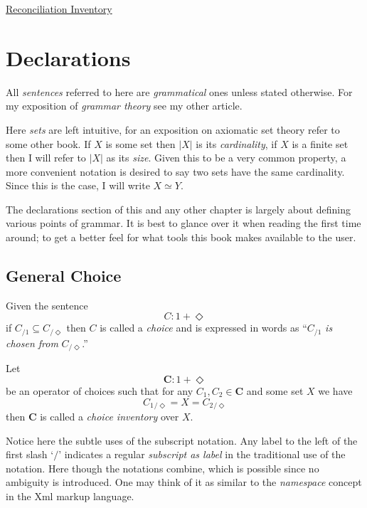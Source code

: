 \documentclass[twoside]{book}
\newcommand{\pass}[1][\Diamond]{\ensuremath{{_{\!/{#1}}}}}
\newcommand{\syntax}[1][\Diamond]{\ensuremath{1+{#1}}}
\renewcommand{\bold}[1][C]{\ensuremath{{\mathbf #1}}}
\newenvironment{definition}[1][Definition]{\begin{trivlist}
\item[\hskip \labelsep {\bfseries Definition (#1):}]}{\end{trivlist}}
\newlength{\htwo}
\begin{document}
\hspace{\htwo}\hypertarget{oReconciliationInventory}{\hyperlink{ReconciliationInventory}{Reconciliation Inventory}}

\section{Declarations}

All \emph{sentences} referred to here are \emph{grammatical} ones unless stated otherwise.  For my
exposition of \emph{grammar theory} see my other article.

Here \emph{sets} are left intuitive, for an exposition on axiomatic set theory refer to some other book.
If $ X $ is some set then $ |X| $ is its \emph{cardinality}, if $ X $ is a finite set then I will refer
to $ |X| $ as its \emph{size}.  Given this to be a very common property, a more convenient notation is
desired to say two sets have the same cardinality.  Since this is the case, I will write $ X\simeq Y $.

The declarations section of this and any other chapter is largely about defining various points of grammar.
It is best to glance over it when reading the first time around; to get a better feel for what tools this book
makes available to the user.

\subsection{General Choice}

\begin{definition}[\hypertarget{Choice}{\hyperlink{oChoice}{Choice}}]

Given the sentence
$$ C:\syntax $$
if $ C\pass[1]\subseteq C\pass $ then $ C $ is called a \emph{choice}
and is expressed in words as ``$ C\pass[1] $ \emph{is chosen from} $ C\pass $.''

\end{definition}

\begin{definition}[\hypertarget{ChoiceInventory}{\hyperlink{oChoiceInventory}{Choice Inventory}}]

Let
$$ \bold[C:\syntax] $$
be an operator of choices such that for any $ C_1, C_2\in\bold $ and some set $ X $ we have
$$ C_1\pass=X=C_2\pass $$
then $ \bold $ is called a \emph{choice inventory} over $ X $.

\end{definition}

Notice here the subtle uses of the subscript notation.  Any label to the left of the first slash
`$ / $' indicates a regular \emph{subscript as label} in the traditional use of the notation.
Here though the notations combine, which is possible since no ambiguity is introduced.  One
may think of it as similar to the \emph{namespace} concept in the Xml markup language.
\end{document}

